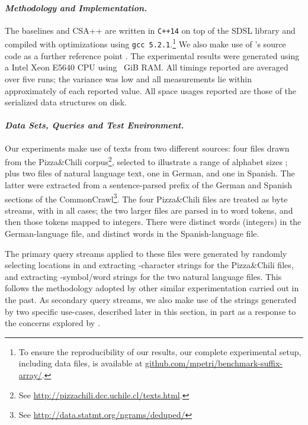 \documentclass{llncs}
\newcommand{\gb}[1]{{\mbox{~GiB}}}
\newcommand{\myparagraph}[1]{\paragraph*{\normalsize\it#1.}}
\begin{document}
\myparagraph{Methodology and Implementation}

The baselines and CSA++ are written in {\tt{C++14}} on top of the
SDSL library {\citep{gbmp2014sea}} and compiled with optimizations
using {\tt{gcc~5.2.1}}.\footnote{To ensure the reproducibility of our
results, our complete experimental setup, including data files, is
available at {\url{github.com/mpetri/benchmark-suffix-array/}}.}
We also make use of {\citeauthor{s-jalg03}}'s source code as a
further reference point {\citep{s-jalg03}}.
The experimental results were generated using a Intel Xeon E5640 CPU
using {\gb{144}} RAM.
All timings reported are averaged over five runs; the variance was
low and all measurements lie within approximately  of each reported
value.
All space usages reported are those of the serialized data structures
on disk.

\myparagraph{Data Sets, Queries and Test Environment}


Our experiments make use of texts  from two different sources:
four  files drawn from the Pizza\&Chili
corpus\footnote{See
{\url{http://pizzachili.dcc.uchile.cl/texts.html}}.}, selected to
illustrate a range of alphabet sizes ; plus two 
files of natural language text, one in German, and one in Spanish.
The latter were extracted from a sentence-parsed prefix of the German
and Spanish sections of the CommonCrawl\footnote{See
{\url{http://data.statmt.org/ngrams/deduped/}}}.
The four  Pizza\&Chili files are treated as byte streams,
with  in all cases; the two larger files are parsed in
to word tokens, and then those tokens mapped to integers.
There were  distinct words (integers) in the
German-language file, and  distinct words in
the Spanish-language file.

The primary query streams applied to these files were generated by
randomly selecting  locations in  and extracting
-character strings for the Pizza\&Chili files, and extracting
-symbol/word strings for the two natural language files.
This follows the methodology adopted by other similar experimentation
carried out in the past.
As secondary query streams, we also make use of the strings generated
by two specific use-cases, described later in this section, in part
as a response to the concerns explored by {\citet{mg14trs}}.
\end{document}
